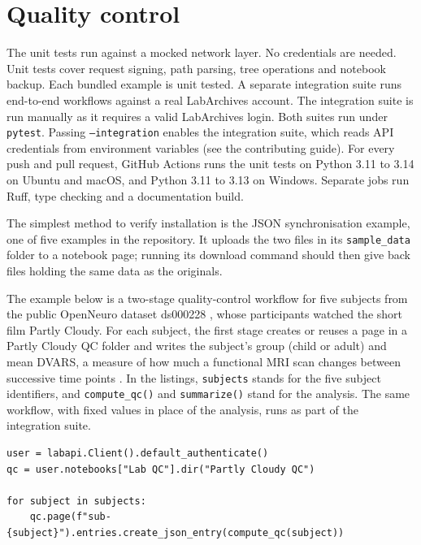 \documentclass{jors}
\begin{document}
\section*{Quality control}

The unit tests run against a mocked network layer. No credentials are
needed. Unit tests cover request signing, path parsing, tree operations
and notebook backup. Each bundled example is unit tested. A separate
integration suite runs end-to-end workflows against a real LabArchives
account. The
integration suite is run manually as it requires a valid LabArchives
login. Both suites run under \texttt{pytest}. Passing
\texttt{--integration} enables the integration suite,
which reads API credentials from environment variables (see the
contributing guide). For every push and pull request, GitHub Actions runs the unit
tests on Python 3.11 to 3.14 on Ubuntu and macOS, and Python 3.11 to 3.13
on Windows. Separate jobs run Ruff, type checking and a documentation build.

The simplest method to verify installation is the JSON synchronisation
example, one of five examples in the repository.
It uploads the two files in its
\texttt{sample\_data} folder to a notebook page; running its download
command should then give back files holding the same data as the originals.

The example below is a two-stage quality-control workflow for five
subjects from the public OpenNeuro dataset ds000228 \citep{ds000228},
whose participants watched the short film Partly Cloudy. For each subject,
the first stage creates or reuses a page in a Partly Cloudy QC folder and
writes the subject's group (child or adult) and mean DVARS, a measure of
how much a functional MRI scan changes between successive time points
\citep{power2012dvars}. In the listings, \texttt{subjects} stands for the
five subject identifiers, and \texttt{compute\_qc()} and
\texttt{summarize()} stand for the analysis. The same workflow, with fixed
values in place of the analysis, runs as part of the integration suite.

\medskip
{\footnotesize\noindent\begin{minipage}{\linewidth}
\begin{verbatim}
user = labapi.Client().default_authenticate()
qc = user.notebooks["Lab QC"].dir("Partly Cloudy QC")

for subject in subjects:
    qc.page(f"sub-{subject}").entries.create_json_entry(compute_qc(subject))
\end{verbatim}
\end{minipage}}
\medskip
\end{document}

